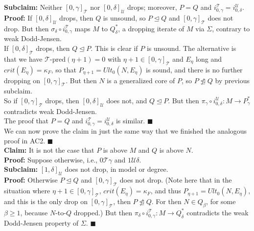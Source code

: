 \documentclass[12pt]{article}
\begin{document}
\textbf{Subclaim:} Neither $[0, \gamma]_{\mathscr{T}}$ nor $[0, \delta]_{\mathscr{U}}$ drops; moreover, $P = Q$ and $i_{0, \gamma}^{\mathscr{T}} = i_{0, \delta}^{\mathscr{U}}$.\\

\textbf{Proof:} If $[ 0 , \delta ]_{\mathscr{U}}$ drops, then $Q$ is unsound, so $P \unlhd Q$ and $[ 0 , \gamma ]_{\mathscr{T}}$ does not drop.  But then $\sigma_\delta \circ i_{0 , \gamma}^{\mathscr{T}}$ maps $M$ to $Q_\delta^*$, a dropping iterate of $M$ via $\Sigma$, contrary to weak Dodd-Jensen.\\

If $[ 0 , \delta ]_{\mathscr{T}}$ drops, then $Q \unlhd P$.  This is clear if $P$ is unsound.  The alternative is that we have $\mathscr{T} \text{-pred} (\eta + 1) = 0$ with $\eta + 1 \in [ 0 , \gamma ]_{\mathscr{T}}$ and $E_\eta$ long and $crit(E_\eta) = \kappa_F$, so that $P_{\eta + 1} = Ult_0 (N, E_\eta)$ is sound, and there is no further dropping on $[ 0 , \gamma]_{\mathscr{T}}$.  But then $N$ is a generalized core of $P$, so $P \ntrianglelefteq Q$ by previous subclaim.\\

So if $[ 0 , \gamma ]_{\mathscr{T}}$ drops, then $[ 0 , \delta ]_{\mathscr{U}}$ does not, and $Q \unlhd P$.  But then $\pi_\gamma \circ i_{0, \delta}^{\mathscr{U}} : M \longrightarrow P_\gamma^*$ contradicts weak Dodd-Jensen.\\

The proof that $P = Q$ and $i_{0, \gamma}^{\mathscr{T}} = i_{0 , \delta}^{\mathscr{U}}$ is similar. $\blacksquare$\\

We can now prove the claim in just the same way that we finished the analogous proof in AC2. $\blacksquare$\\

\textbf{Claim:}  It is not the case that $P$ is above $M$ and $Q$ is above $N$.\\

\textbf{Proof:} Suppose otherwise, i.e., $0 \mathscr{T} \gamma$ and $1 \mathscr{U} \delta$.\\

\textbf{Subclaim:} $[1, \delta]_{\mathscr{U}}$ does not drop, in model or degree.\\

\textbf{Proof:} Otherwise $P \unlhd Q$ and $[ 0 , \gamma ]_{\mathscr{T}}$ does not drop.  (Note here that in the situation where $\eta + 1 \in [ 0 , \gamma ]_{\mathscr{T}}$, $crit (E_\eta) = \kappa_F$, and thus $P_{\eta + 1} = Ult_0 (N, E_\eta)$, and this is the only drop on $[0, \gamma]_{\mathscr{T}}$, then $P \ntrianglelefteq Q$.  For then $N \in Q_\beta$, for some $\beta \geq 1$, because $N$-to-$Q$ dropped.)  But then $\pi_\delta \circ i_{0 , \gamma }^{\mathscr{T}} : M \longrightarrow Q_\delta^*$ contradicts the weak Dodd-Jensen property of $\Sigma$. $\blacksquare$\\
\end{document}
